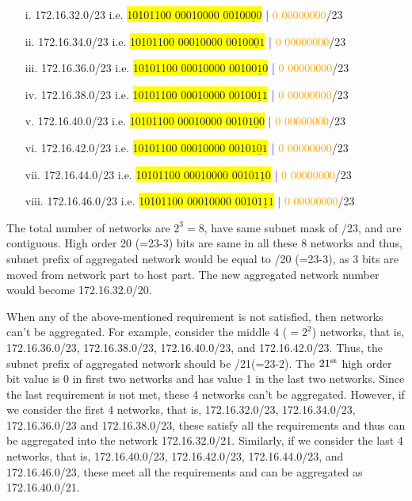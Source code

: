 \begin{multicols}{2}
\begin{itemize}
\item[i.] 172.16.32.0/23 i.e. \colorbox{yellow}{10101100 00010000 0010$\underline{\textit{000}}$} \textcolor{blue}{|} \textcolor{orange}{0 00000000}/23
\item[ii.] 172.16.34.0/23 i.e. \colorbox{yellow}{10101100 00010000 0010$\underline{\textit{001}}$} \textcolor{blue}{|} \textcolor{orange}{0 00000000}/23
\item[iii.] 172.16.36.0/23 i.e. \colorbox{yellow}{10101100 00010000 0010$\underline{\textit{010}}$} \textcolor{blue}{|} \textcolor{orange}{0 00000000}/23
\item[iv.] 172.16.38.0/23 i.e. \colorbox{yellow}{10101100 00010000 0010$\underline{\textit{011}}$} \textcolor{blue}{|} \textcolor{orange}{0 00000000}/23
\item[v.] 172.16.40.0/23 i.e. \colorbox{yellow}{10101100 00010000 0010$\underline{\textit{100}}$} \textcolor{blue}{|} \textcolor{orange}{0 00000000}/23
\item[vi.] 172.16.42.0/23 i.e. \colorbox{yellow}{10101100 00010000 0010$\underline{\textit{101}}$} \textcolor{blue}{|} \textcolor{orange}{0 00000000}/23
\item[vii.] 172.16.44.0/23 i.e. \colorbox{yellow}{10101100 00010000 0010$\underline{\textit{110}}$} \textcolor{blue}{|} \textcolor{orange}{0 00000000}/23
\item[viii.] 172.16.46.0/23 i.e. \colorbox{yellow}{10101100 00010000 0010$\underline{\textit{111}}$} \textcolor{blue}{|} \textcolor{orange}{0 00000000}/23
\end{itemize}

The total number of networks are $2^{3}=8$, have same subnet mask of /23, and are contiguous. High order 20 (=23-3) bits are same in all these 8 networks and thus, subnet prefix of aggregated network would be equal to /20 (=23-3), as 3 bits are moved from network part to host part. The new aggregated network number would become 172.16.32.0/20.

When any of the above-mentioned requirement is not satisfied, then networks can’t be aggregated. For example, consider the middle 4 ($=2^{2}$) networks, that is, 172.16.36.0/23, 172.16.38.0/23, 172.16.40.0/23, and 172.16.42.0/23. Thus, the subnet prefix of aggregated network should be /21(=23-2). The $21^{\rm st}$ high order bit value is 0 in first two networks and has value 1 in the last two networks. Since the last requirement is not met, these 4 networks can’t be aggregated. However, if we consider the first 4 networks, that is, 172.16.32.0/23, 172.16.34.0/23, 172.16.36.0/23 and 172.16.38.0/23, these satisfy all the requirements and thus can be aggregated into the network 172.16.32.0/21. Similarly, if we consider the last 4 networks, that is, 172.16.40.0/23, 172.16.42.0/23, 172.16.44.0/23, and 172.16.46.0/23, these meet all the requirements and can be aggregated as 172.16.40.0/21.


\end{multicols}
